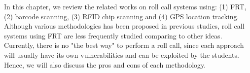 In this chapter, we review the related works on roll call systems using:
(1) FRT, (2) barcode scanning, (3) RFID chip scanning and (4) GPS location tracking.
Although various methodologies has been proposed in previous studies, roll call systems
using FRT are less frequently studied comparing to other ideas. Currently, there is no
"the best way" to perform a roll call, since each approach will usually have
its own vulnerabilities and can be exploited by the students. Hence, we will also
discuss the pros and cons of each methodology.





